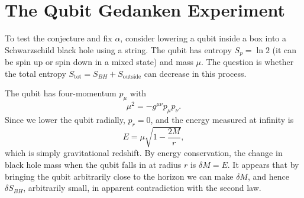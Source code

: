 \section{The Qubit Gedanken Experiment}

To test the conjecture and fix $\alpha$, consider lowering a qubit
inside a box into a Schwarzschild black hole using a string. The qubit
has entropy $S_p = \ln 2$ (it can be spin up or spin down in a mixed
state) and mass $\mu$. The question is whether the total entropy
$S_{\text{tot}} = S_{BH} + S_{\text{outside}}$ can decrease in this
process.


The qubit has four-momentum $p_\mu$ with
\begin{equation}
	\mu^2 = -g^{\mu\nu}p_\mu p_\nu.
\end{equation}
Since we lower the qubit radially, $p_r = 0$, and the energy measured
at infinity is
\begin{equation}
	E = \mu\sqrt{1-\frac{2M}{r}},
\end{equation}
which is simply gravitational redshift. By energy conservation, the
change in black hole mass when the qubit falls in at radius $r$ is
$\delta M = E$. It appears that by bringing the qubit arbitrarily
close to the horizon we can make $\delta M$, and hence $\delta S_{BH}$,
arbitrarily small, in apparent contradiction with the second law.

